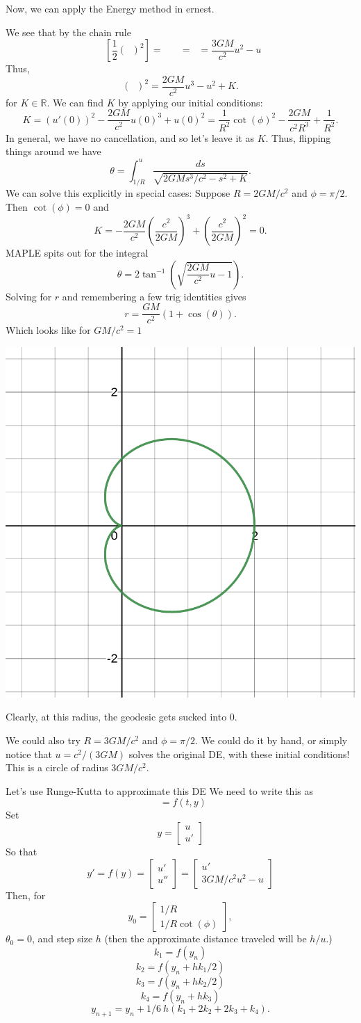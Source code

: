 \documentclass[12pt]{article}
\newcommand{\diff}[2][]{\mathop{\frac{d #1}{d #2}}}
\let\bb\mathbb
\begin{document}
Now, we can apply the Energy method in ernest.

We see that by the chain rule
$$\diff u \left[\frac12 \left(\diff[u]\theta\right)^2\right] = \diff[u]\theta 
\diff[^2u]{\theta^2} \diff[\theta]u = \diff[^2u]{\theta^2} = \frac{3GM}{c^2}u^2 - u$$
Thus,
$$\left(\diff[u]\theta\right)^2 = \frac{2GM}{c^2}u^3 - u^2 + K.$$
for $K \in \bb R.$
We can find $K$ by applying our initial conditions:
$$K = (u'(0))^2 - \frac{2GM}{c^2}u(0)^3 + u(0)^2 = \frac1{R^2}\cot(\phi)^2 - 
\frac{2GM}{c^2 R^3} + \frac1{R^2}.$$
In general, we have no cancellation, and so let's leave it as $K$.
Thus, flipping things around we have 
$$\theta = \int_{1/R}^u \frac{ds}{\sqrt{2GM s^3 / c^2 - s^2 + K}}.$$
We can solve this explicitly in special cases:
Suppose $R = 2GM/c^2$ and $\phi = \pi/2$. Then $\cot(\phi) = 0$ and 
$$K  = -\frac{2GM}{c^2}\left(\frac{c^2}{2GM}\right)^3 + \left(\frac{c^2}{2GM}\right)^2 = 0.$$
MAPLE spits out for the integral
$$\theta = 2\tan^{-1}\left(\sqrt{\frac{2GM}{c^2}u - 1}\right).$$
Solving for $r$ and remembering a few trig identities gives
$$r = \frac{GM}{c^2}(1+\cos(\theta)).$$
Which looks like for $GM/c^2 = 1$ 

\includegraphics[width=.5\linewidth]{./schwartzschild.png}

Clearly, at this radius, the geodesic gets sucked into 0.

We could also try $R = 3GM/c^2$ and $\phi = \pi/2$. We could do it by hand, or 
simply notice that $u = c^2/(3GM)$ solves the original DE, with these initial conditions!
This is a circle of radius $3GM/c^2.$

Let's use Runge-Kutta to approximate this DE
We need to write this as 
$$\diff[y]t = f(t,y)$$
Set $$y = \left[\begin{array}{c} u\\ u' \end{array}\right]$$
So that 
$$ y' = f(y) = \left[\begin{array}{c} u'\\ u'' \end{array}\right] 
= \left[\begin{array}{c} u'\\ 3GM/c^2 u^2 - u \end{array}\right]$$
Then, for 
$$y_0 = \left[\begin{array}{c} 1/R\\ 1/R \cot(\phi) \end{array}\right],$$
$\theta_0 = 0$,
and step size $h$ (then the approximate distance traveled will be $h/u.$)
$$k_1 = f(y_n)$$
$$k_2 = f(y_n + h k_1/2)$$
$$k_3 = f(y_n + h k_2/2)$$
$$k_4 = f(y_n + h k_3)$$
$$y_{n+1} = y_n + 1/6 ~ h (k_1 + 2k_2 + 2k_3 + k_4).$$
\end{document}
